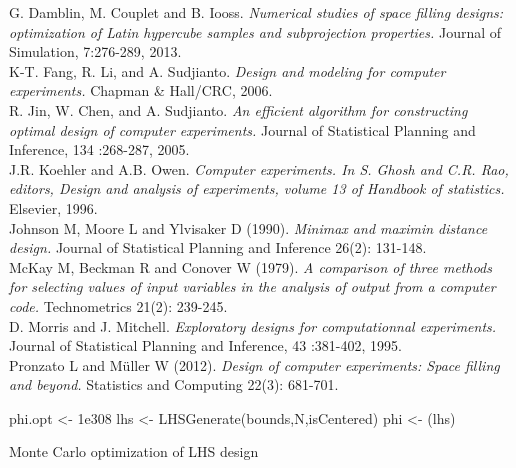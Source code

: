 {%
G. Damblin, M. Couplet and B. Iooss. \textit{Numerical studies of space filling designs: optimization of Latin hypercube samples and subprojection properties.} Journal of Simulation, 7:276-289, 2013.\\
K-T. Fang, R. Li, and A. Sudjianto. \textit{Design and modeling for computer experiments.} Chapman \& Hall\slash CRC, 2006.\\
R. Jin, W. Chen, and A. Sudjianto. \textit{An efficient algorithm for constructing optimal design of computer experiments.} Journal of Statistical Planning and Inference, 134 :268-287, 2005.\\
J.R. Koehler and A.B. Owen. \textit{Computer experiments. In S. Ghosh and C.R. Rao, editors, Design and analysis of experiments, volume 13 of Handbook of statistics.} Elsevier, 1996.\\
Johnson M, Moore L and Ylvisaker D (1990). \textit{Minimax and maximin distance design.} Journal of Statistical Planning and Inference 26(2): 131-148.\\
McKay M, Beckman R and Conover W (1979). \textit{A comparison of three methods for selecting values of input variables in the analysis of output from a computer code.} Technometrics 21(2): 239-245.\\
D. Morris and J. Mitchell. \textit{Exploratory designs for computationnal experiments.} Journal of Statistical Planning and Inference, 43 :381-402, 1995.\\
Pronzato L and M\"uller W (2012). \textit{Design of computer experiments: Space filling and beyond.} Statistics and Computing 22(3): 681-701.\\
}

\begin{algorithm}[htbp]
\BlankLine
 phi.opt <- 1e308\;
 {
  lhs <- LHSGenerate(bounds,N,isCentered)\;
  phi <- \PhiC(lhs)\;
 }
 \caption{Monte Carlo optimization of LHS design}
 \label{algo_MC}
\end{algorithm}

